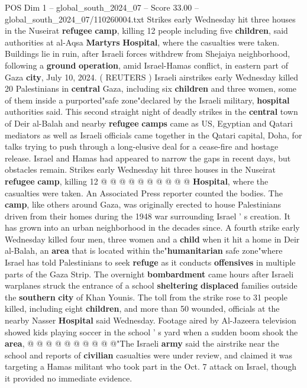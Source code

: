 \begin{textsample}{POS Dim 1 – global\_south\_2024\_07 – Score 33.00 – global\_south\_2024\_07/110260004.txt}  \label{ex:f1_pos_172}
Strikes early Wednesday hit three houses in the Nuseirat \textbf{refugee} \textbf{camp}, killing 12 people including five \textbf{children}, said authorities at al-Aqsa \textbf{Martyrs} \textbf{Hospital}, where the casualties were taken.
Buildings lie in ruin, after Israeli forces withdrew from Shejaiya neighborhood, following a \textbf{ground} \textbf{operation}, amid Israel-Hamas conflict, in eastern part of Gaza \textbf{city}, July 10, 2024. ( REUTERS ) Israeli airstrikes early Wednesday killed 20 Palestinians in \textbf{central} Gaza, including six \textbf{children} and three women, some of them inside a purported"safe zone"declared by the Israeli military, \textbf{hospital} authorities said.
This second straight night of deadly strikes in the \textbf{central} town of Deir al-Balah and nearby \textbf{refugee} \textbf{camps} came as US, Egyptian and Qatari mediators as well as Israeli officials came together in the Qatari capital, Doha, for talks trying to push through a long-elusive deal for a cease-fire and hostage release.
Israel and Hamas had appeared to narrow the gaps in recent days, but obstacles remain.
Strikes early Wednesday hit three houses in the Nuseirat \textbf{refugee} \textbf{camp}, killing 12 @ @ @ @ @ @ @ @ @ @ \textbf{Hospital}, where the casualties were taken.
An Associated Press reporter counted the bodies.
The \textbf{camp}, like others around Gaza, was originally erected to house Palestinians driven from their homes during the 1948 war surrounding Israel ' s creation.
It has grown into an urban neighborhood in the decades since.
A fourth strike early Wednesday killed four men, three women and a \textbf{child} when it hit a home in Deir al-Balah, an \textbf{area} that is located within the"\textbf{humanitarian} safe zone"where Israel has told Palestinians to seek \textbf{refuge} as it conducts \textbf{offensives} in multiple parts of the Gaza Strip.
The overnight \textbf{bombardment} came hours after Israeli warplanes struck the entrance of a school \textbf{sheltering} \textbf{displaced} families outside the \textbf{southern} \textbf{city} of Khan Younis.
The toll from the strike rose to 31 people killed, including eight \textbf{children}, and more than 50 wounded, officials at the nearby Nasser \textbf{Hospital} said Wednesday.
Footage aired by Al-Jazeera television showed kids playing soccer in the school ' s yard when a sudden boom shook the \textbf{area}, @ @ @ @ @ @ @ @ @ @"The Israeli \textbf{army} said the airstrike near the school and reports of \textbf{civilian} casualties were under review, and claimed it was targeting a Hamas militant who took part in the Oct. 7 attack on Israel, though it provided no immediate evidence.

\end{textsample}
